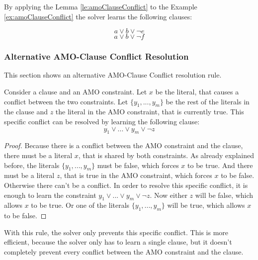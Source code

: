 By applying the Lemma \ref{le:amoClauseConflict} to the Example \ref{ex:amoClauseConflict} the solver learns the following clauses:

\begin{leftbar}
\begin{displaymath}
a \vee b \vee \neg e
\end{displaymath}
\begin{displaymath}
a \vee b \vee \neg f
\end{displaymath}
\end{leftbar}

\subsubsection{Alternative AMO-Clause Conflict Resolution}
This section shows an alternative AMO-Clause Conflict resolution rule.

\begin{lemma}
\begin{leftbar}
Consider a clause and an AMO constraint. Let $x$ be the literal, that causes a conflict between the two constraints. Let $\{y_1,...,y_m\}$ be the rest of the literals in the clause and $z$ the literal in the AMO constraint, that is currently true. This specific conflict can be resolved by learning the following clause:
\begin{displaymath}
y_1 \vee ... \vee y_m \vee \neg z
\end{displaymath}
\end{leftbar}
\end{lemma}

\begin{proof}
Because there is a conflict between the AMO constraint and the clause, there must be a literal $x$, that is shared by both constraints. As already explained before, the literals $\{y_1,...,y_m\}$ must be false, which forces $x$ to be true. And there must be a literal $z$, that is true in the AMO constraint, which forces $x$ to be false. Otherwise there can't be a conflict. In order to resolve this specific conflict, it is enough to learn the constraint $y_1 \vee ... \vee y_m \vee \neg z$. Now either $z$ will be false, which allows $x$ to be true. Or one of the literals $\{y_1,...,y_m\}$ will be true, which allows $x$ to be false.
\end{proof}

With this rule, the solver only prevents this specific conflict. This is more efficient, because the solver only has to learn a single clause, but it doesn't completely prevent every conflict between the AMO constraint and the clause.

